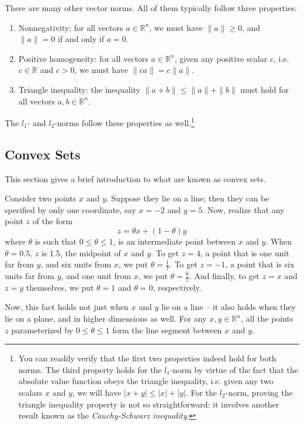 \documentclass[a4paper]{article}
\theoremstyle{definition}
\begin{document}
There are many other vector norms.
All of them typically follow three properties:
\begin{enumerate}
	\item Nonnegativity: for all vectors $a \in \mathbb{R}^n$, we must have $\| a \| \geq 0$, and $\| a \| = 0$ if and only if $a = 0$.
	\item Positive homogeneity: for all vectors $a \in \mathbb{R}^n$, given any positive scalar $c$, i.e. $c \in \mathbb{R}$ and $c > 0$, we must have $\| ca \| = c \| a \|$.
	\item Triangle inequality: the inequality $\| a + b \| \leq \| a \| + \| b \|$ must hold for all vectors $a, b \in \mathbb{R}^n$.
\end{enumerate}
The $l_1$- and $l_2$-norms follow these properties as well.\footnote{
You can readily verify that the first two properties indeed hold for both norms.
The third property holds for the $l_1$-norm by virtue of the fact that the absolute value function obeys the triangle inequality, i.e. given any two scalars $x$ and $y$, we will have $| x + y | \leq |x| + |y|$.
For the $l_2$-norm, proving the triangle inequality property is not so straightforward: it involves another result known as the \textit{Cauchy-Schwarz inequality}.}

\subsection{Convex Sets}
\label{convex-sets}

This section gives a brief introduction to what are known as convex sets.

Consider two points $x$ and $y$.
Suppose they lie on a line; then they can be specified by only one coordinate, say $x = -2$ and $y = 5$.
Now, realize that any point $z$ of the form
\begin{equation*}
	z = \theta x + (1 - \theta) y
\end{equation*}
where $\theta$ is such that $0 \leq \theta \leq 1$, is an intermediate point between $x$ and $y$.
When $\theta = 0.5$, $z$ is 1.5, the midpoint of $x$ and $y$.
To get $z = 4$, a point that is one unit far from $y$, and six units from $x$, we put $\theta = \frac{1}{7}$.
To get $z = -1$, a point that is six units far from $y$, and one unit from $x$, we put $\theta = \frac{6}{7}$.
And finally, to get $z = x$ and $z = y$ themselves, we put $\theta = 1$ and $\theta = 0$, respectively.

Now, this fact holds not just when $x$ and $y$ lie on a line -- it also holds when they lie on a plane, and in higher dimensions as well.
For any $x, y \in \mathbb{R}^n$, all the points $z$ parameterized by $0 \leq \theta \leq 1$ form the line segment between $x$ and $y$.
\end{document}
